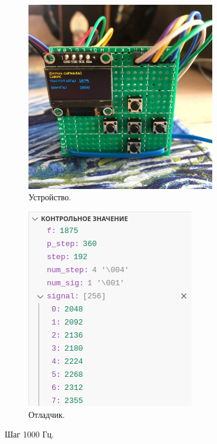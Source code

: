 	\begin{figure}[H]
     \begin{subfigure}[H]{0.5\textwidth}
         \centering
         \includegraphics[width=0.9\textwidth]{../image/test4_u_f.jpg}
         \caption{Устройство.}
     \end{subfigure}
     \hfill
     \begin{subfigure}[H]{0.5\textwidth}
         \centering
         \includegraphics[width=0.8\textwidth]{../image/test4_o_f.png}
         \caption{Отладчик.}
     \end{subfigure}
        \caption{Шаг 1000 Гц.}
	\end{figure}
	
